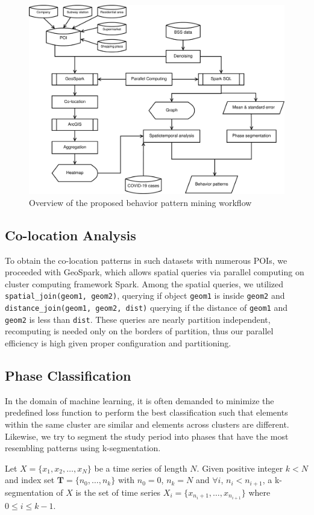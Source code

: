 \documentclass[ijgi,submit,moreauthors,pdftex]{Definitions/mdpi}
\begin{document}
\begin{figure}[ht]
    \centering
    \includegraphics[width=.8\textwidth]{diagram.pdf}
    \caption{Overview of the proposed behavior pattern mining workflow}
    \label{fig:diagram}
\end{figure}

\subsection{Co-location Analysis}\label{sec:co-location}
To obtain the co-location patterns in such datasets with numerous POIs, we proceeded with GeoSpark, which allows spatial queries via parallel computing on cluster computing framework Spark.
Among the spatial queries, we utilized \texttt{spatial\_join(geom1, geom2)}, querying if object \texttt{geom1} is inside \texttt{geom2} and \texttt{distance\_join(geom1, geom2, dist)} querying if the distance of \texttt{geom1} and \texttt{geom2} is less than \texttt{dist}.
These queries are nearly partition independent, recomputing is needed only on the borders of partition, thus our parallel efficiency is high given proper configuration and partitioning.

\subsection{Phase Classification}\label{sec:phase_classification}
In the domain of machine learning, it is often demanded to minimize the predefined loss function to perform the best classification such that elements within the same cluster are similar and elements across clusters are different.
Likewise, we try to segment the study period into phases that have the most resembling patterns using k-segmentation.

\begin{Definition}[k-segmentation]\label{def:k-seg}
Let $X=\{x_1,x_2,\ldots,x_N\}$ be a time series of length $N$.
Given positive integer $k<N$ and index set $\mathbf{T}=\{n_0,\ldots,n_k\}$ with $n_0=0$, $n_k=N$ and $\forall i$, $n_i<n_{i+1}$, a k-segmentation of $X$ is the set of time series $X_i=\{x_{n_i+1},\ldots,x_{n_{i+1}}\}$ where $0\leq i\leq k-1$.
\end{Definition}
\end{document}
